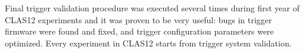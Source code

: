 Final trigger validation procedure was executed several times during first year of CLAS12 experiments and it was proven to be very useful: bugs in trigger firmware were found and fixed, and trigger configuration parameters were optimized. Every experiment in CLAS12 starts from trigger system validation.
